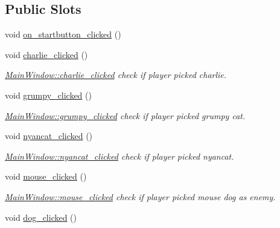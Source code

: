 \subsection*{Public Slots}
\begin{DoxyCompactItemize}
\item 
void \hyperlink{class_main_window_a49fca0e8fb079b547aab74a32bc7baef}{on\+\_\+startbutton\+\_\+clicked} ()
\item 
\hypertarget{class_main_window_a62d37a81c0f9509fbe7ce023563e2f55}{}void \hyperlink{class_main_window_a62d37a81c0f9509fbe7ce023563e2f55}{charlie\+\_\+clicked} ()\label{class_main_window_a62d37a81c0f9509fbe7ce023563e2f55}

\begin{DoxyCompactList}\small\item\em \hyperlink{class_main_window_a62d37a81c0f9509fbe7ce023563e2f55}{Main\+Window\+::charlie\+\_\+clicked} check if player picked charlie. \end{DoxyCompactList}\item 
\hypertarget{class_main_window_af7fed86d97e632ec10688deaaf40a9bd}{}void \hyperlink{class_main_window_af7fed86d97e632ec10688deaaf40a9bd}{grumpy\+\_\+clicked} ()\label{class_main_window_af7fed86d97e632ec10688deaaf40a9bd}

\begin{DoxyCompactList}\small\item\em \hyperlink{class_main_window_af7fed86d97e632ec10688deaaf40a9bd}{Main\+Window\+::grumpy\+\_\+clicked} check if player picked grumpy cat. \end{DoxyCompactList}\item 
\hypertarget{class_main_window_abf315b2e51762568c3613df5174f2edf}{}void \hyperlink{class_main_window_abf315b2e51762568c3613df5174f2edf}{nyancat\+\_\+clicked} ()\label{class_main_window_abf315b2e51762568c3613df5174f2edf}

\begin{DoxyCompactList}\small\item\em \hyperlink{class_main_window_abf315b2e51762568c3613df5174f2edf}{Main\+Window\+::nyancat\+\_\+clicked} check if player picked nyancat. \end{DoxyCompactList}\item 
\hypertarget{class_main_window_ae18d7434c70c6d778a308754e2f45544}{}void \hyperlink{class_main_window_ae18d7434c70c6d778a308754e2f45544}{mouse\+\_\+clicked} ()\label{class_main_window_ae18d7434c70c6d778a308754e2f45544}

\begin{DoxyCompactList}\small\item\em \hyperlink{class_main_window_ae18d7434c70c6d778a308754e2f45544}{Main\+Window\+::mouse\+\_\+clicked} check if player picked mouse dog as enemy. \end{DoxyCompactList}\item 
\hypertarget{class_main_window_a6fda2b6088de157a1e17c549dfa2b535}{}void \hyperlink{class_main_window_a6fda2b6088de157a1e17c549dfa2b535}{dog\+\_\+clicked} ()\label{class_main_window_a6fda2b6088de157a1e17c549dfa2b535}


\end{DoxyCompactItemize}
